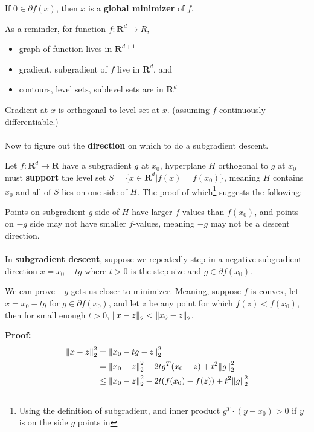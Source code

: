 \documentclass{article}
\begin{document}
If $0 \in \partial f(x)$, then $x$ is a \textbf{global minimizer} of $f$.

As a reminder, for function $f : \mathbf{R}^d \to R$,
\begin{itemize}
  \item graph of function lives in $\mathbf{R}^{d + 1}$
  \item gradient, subgradient of $f$ live in $\mathbf{R}^d$, and
  \item contours, level sets, sublevel sets are in $\mathbf{R}^d$
\end{itemize}

Gradient at $x$ is orthogonal to level set at $x$. (assuming $f$ continuously differentiable.)
\\
\\
Now to figure out the \textbf{direction} on which to do a subgradient descent.

Let $f : \mathbf{R}^d \to \mathbf{R}$ have a subgradient $g$ at $x_0$, hyperplane $H$ orthogonal to $g$ at $x_0$ must \textbf{support} the level set $S = \{ x \in \mathbf{R}^d | f(x) = f(x_0) \}$, meaning $H$ contains $x_0$ and all of $S$ lies on one side of $H$.
The proof of which\footnote{Using the definition of subgradient, and inner product $g^T \cdot (y - x_0) > 0$ if $y$ is on the side $g$ points in} suggests the following:

Points on subgradient $g$ side of $H$ have larger $f$-values than $f(x_0)$, and points on $-g$ side may not have smaller $f$-values, meaning $-g$ may not be a descent direction.
\\
\\
In \textbf{subgradient descent}, suppose we repeatedly step in a negative subgradient direction $x = x_0 - t g$ where $t > 0$ is the step size and $g \in \partial f(x_0)$.

We can prove $-g$ gets us closer to minimizer.
Meaning, suppose $f$ is convex, let $x = x_0 - t g$ for $g \in \partial f(x_0)$, and let $z$ be any point for which $f(z) < f(x_0)$, then for small enough $t > 0$, $\norm{x - z}_2 < \norm{x_0 - z}_2$.

\textbf{Proof:}
\begin{align*}
\norm{x - z}_2^2 &= \norm{x_0 - tg - z}_2^2 \\
                 &= \norm{x_0 - z}_2^2 - 2 t g^T (x_0 - z) + t^2 \norm{g}_2^2 \\
                 &\leq \norm{x_0 - z}_2^2 - 2 t (f(x_0) - f(z)) + t^2 \norm{g}_2^2
\end{align*}
\end{document}
